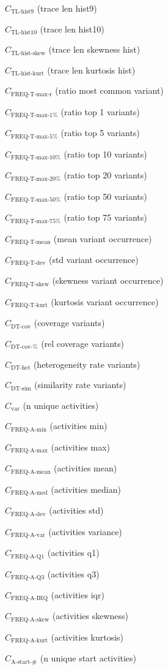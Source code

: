 \documentclass[a4paper]{article}
\newcommand{\varietyname}{\text{var}}
\newcommand{\variety}{C_{\varietyname}}
\newcommand{\startactivitiesname}{\text{A-start-\#}}
\newcommand{\startactivities}{C_{\startactivitiesname}}
\newcommand{\tlhistninename}{\text{TL-hist9}}
\newcommand{\tlhistnine}{C_{\tlhistninename}}
\newcommand{\tlhisttenname}{\text{TL-hist10}}
\newcommand{\tlhistten}{C_{\tlhisttenname}}
\newcommand{\tlskewhistname}{\text{TL-hist-skew}}
\newcommand{\tlskewhist}{C_{\tlskewhistname}}
\newcommand{\tlkurthistname}{\text{TL-hist-kurt}}
\newcommand{\tlkurthist}{C_{\tlkurthistname}}
\newcommand{\freqmaxrname}{\text{FREQ-T-max-r}}
\newcommand{\freqmaxr}{C_{\freqmaxrname}}
\newcommand{\freqmaxonename}{\text{FREQ-T-max-1\%}}
\newcommand{\freqmaxone}{C_{\freqmaxonename}}
\newcommand{\freqmaxfivename}{\text{FREQ-T-max-5\%}}
\newcommand{\freqmaxfive}{C_{\freqmaxfivename}}
\newcommand{\freqmaxtenname}{\text{FREQ-T-max-10\%}}
\newcommand{\freqmaxten}{C_{\freqmaxtenname}}
\newcommand{\freqmaxtwentyname}{\text{FREQ-T-max-20\%}}
\newcommand{\freqmaxtwenty}{C_{\freqmaxtwentyname}}
\newcommand{\freqmaxfiftyname}{\text{FREQ-T-max-50\%}}
\newcommand{\freqmaxfifty}{C_{\freqmaxfiftyname}}
\newcommand{\freqmaxseventyfivename}{\text{FREQ-T-max-75\%}}
\newcommand{\freqmaxseventyfive}{C_{\freqmaxseventyfivename}}
\newcommand{\freqmeanname}{\text{FREQ-T-mean}}
\newcommand{\freqmean}{C_{\freqmeanname}}
\newcommand{\freqdevname}{\text{FREQ-T-dev}}
\newcommand{\freqdev}{C_{\freqdevname}}
\newcommand{\freqskewname}{\text{FREQ-T-skew}}
\newcommand{\freqskew}{C_{\freqskewname}}
\newcommand{\freqkurtname}{\text{FREQ-T-kurt}}
\newcommand{\freqkurt}{C_{\freqkurtname}}
\newcommand{\actfreqminname}{\text{FREQ-A-min}}
\newcommand{\actfreqmin}{C_{\actfreqminname}}
\newcommand{\actfreqmaxname}{\text{FREQ-A-max}}
\newcommand{\actfreqmax}{C_{\actfreqmaxname}}
\newcommand{\actfreqmeanname}{\text{FREQ-A-mean}}
\newcommand{\actfreqmean}{C_{\actfreqmeanname}}
\newcommand{\actfreqmedianname}{\text{FREQ-A-med}}
\newcommand{\actfreqmedian}{C_{\actfreqmedianname}}
\newcommand{\actfreqdevname}{\text{FREQ-A-dev}}
\newcommand{\actfreqdev}{C_{\actfreqdevname}}
\newcommand{\actfreqvarname}{\text{FREQ-A-var}}
\newcommand{\actfreqvar}{C_{\actfreqvarname}}
\newcommand{\actfreqqonename}{\text{FREQ-A-Q1}}
\newcommand{\actfreqqone}{C_{\actfreqqonename}}
\newcommand{\actfreqqthreename}{\text{FREQ-A-Q3}}
\newcommand{\actfreqqthree}{C_{\actfreqqthreename}}
\newcommand{\actfreqiqrname}{\text{FREQ-A-IRQ}}
\newcommand{\actfreqiqr}{C_{\actfreqiqrname}}
\newcommand{\actfreqskewname}{\text{FREQ-A-skew}}
\newcommand{\actfreqskew}{C_{\actfreqskewname}}
\newcommand{\actfreqkurtname}{\text{FREQ-A-kurt}}
\newcommand{\actfreqkurt}{C_{\actfreqkurtname}}
\newcommand{\dtcovname}{\text{DT-cov}}
\newcommand{\dtcov}{C_{\dtcovname}}
\newcommand{\dtrelcovname}{\text{DT-cov-\%}}
\newcommand{\dtrelcov}{C_{\dtrelcovname}}
\newcommand{\dthetname}{\text{DT-het}}
\newcommand{\dthet}{C_{\dthetname}}
\newcommand{\dtsimname}{\text{DT-sim}}
\newcommand{\dtsim}{C_{\dtsimname}}
\begin{document}
\begin{compactenum}
\item $\tlhistnine$ (trace len hist9)
\item $\tlhistten$ (trace len hist10)
\item $\tlskewhist$ (trace len skewness hist)
\item $\tlkurthist$ (trace len kurtosis hist)
\item $\freqmaxr$ (ratio most common variant)
\item $\freqmaxone$ (ratio top 1 variants)
\item $\freqmaxfive$ (ratio top 5 variants)
\item $\freqmaxten$ (ratio top 10 variants)
\item $\freqmaxtwenty$ (ratio top 20 variants)
\item $\freqmaxfifty$ (ratio top 50 variants)
\item $\freqmaxseventyfive$ (ratio top 75 variants)
\item $\freqmean$ (mean variant occurrence)
\item $\freqdev$ (std variant occurrence)
\item $\freqskew$ (skewness variant occurrence)
\item $\freqkurt$ (kurtosis variant occurrence)
\item $\dtcov$ (coverage variants)
\item $\dtrelcov$ (rel coverage variants)
\item $\dthet$ (heterogeneity rate variants)
\item $\dtsim$ (similarity rate variants)
\item $\variety$ (n unique activities)
\item $\actfreqmin$ (activities min)
\item $\actfreqmax$ (activities max)
\item $\actfreqmean$ (activities mean)
\item $\actfreqmedian$ (activities median)
\item $\actfreqdev$ (activities std)
\item $\actfreqvar$ (activities variance)
\item $\actfreqqone$ (activities q1)
\item $\actfreqqthree$ (activities q3)
\item $\actfreqiqr$ (activities iqr)
\item $\actfreqskew$ (activities skewness)
\item $\actfreqkurt$ (activities kurtosis)
\item $\startactivities$ (n unique start activities)

\end{compactenum}
\end{document}
